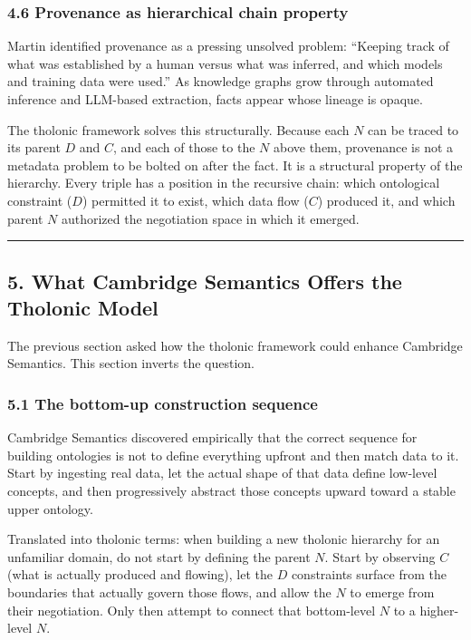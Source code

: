 \documentclass[
  11pt,
  letterpaper,
]{article}
\begin{document}
\subsubsection{4.6 Provenance as hierarchical chain
property}\label{provenance-as-hierarchical-chain-property}

Martin identified provenance as a pressing unsolved problem: ``Keeping
track of what was established by a human versus what was inferred, and
which models and training data were used.'' As knowledge graphs grow
through automated inference and LLM-based extraction, facts appear whose
lineage is opaque.

The tholonic framework solves this structurally. Because each \(N\) can
be traced to its parent \(D\) and \(C\), and each of those to the \(N\)
above them, provenance is not a metadata problem to be bolted on after
the fact. It is a structural property of the hierarchy. Every triple has
a position in the recursive chain: which ontological constraint (\(D\))
permitted it to exist, which data flow (\(C\)) produced it, and which
parent \(N\) authorized the negotiation space in which it emerged.

\begin{center}\rule{0.5\linewidth}{0.5pt}\end{center}

\subsection{5. What Cambridge Semantics Offers the Tholonic
Model}\label{what-cambridge-semantics-offers-the-tholonic-model}

The previous section asked how the tholonic framework could enhance
Cambridge Semantics. This section inverts the question.

\subsubsection{5.1 The bottom-up construction
sequence}\label{the-bottom-up-construction-sequence}

Cambridge Semantics discovered empirically that the correct sequence for
building ontologies is not to define everything upfront and then match
data to it. Start by ingesting real data, let the actual shape of that
data define low-level concepts, and then progressively abstract those
concepts upward toward a stable upper ontology.

Translated into tholonic terms: when building a new tholonic hierarchy
for an unfamiliar domain, do not start by defining the parent \(N\).
Start by observing \(C\) (what is actually produced and flowing), let
the \(D\) constraints surface from the boundaries that actually govern
those flows, and allow the \(N\) to emerge from their negotiation. Only
then attempt to connect that bottom-level \(N\) to a higher-level \(N\).
\end{document}
